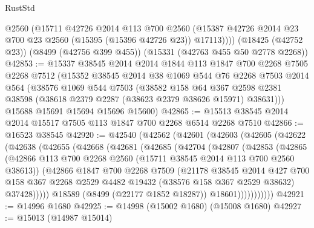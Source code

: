 \begin{lexlean}{RustStd}
\begin{coremodule}
        @2560
        (@15711
          @42726
          @2014
          @113
          @700
          @2560
          (@15387 @42726 @2014 @23 @700 @23 @2560 (@15395 (@15396 @42726 @23)) @17113))))
    (@18425 (@42752 @23))
    (@8499 (@42756 @399 @455))
    (@15331 (@42763 @455 @50 @2778 @2268))
@42853 := @15337
    @38545
    @2014
    @2014
    @1844
    @113
    @1847
    @700
    @2268
    @7505
    @2268
    @7512
    (@15352
      @38545
      @2014
      @38
      @1069
      @544
      @76
      @2268
      @7503
      @2014
      @564
      (@38576
        @1069
        @544
        @7503
        (@38582
          @158
          @64
          @367
          @2598
          @2381
          @38598
          (@38618 @2379 @2287 (@38623 @2379 @38626 @15971) @38631)))
      @15688
      @15691
      @15694
      @15696
      @15600)
@42865 := @15513 @38545 @2014 @2014 @15517 @7505 @113 @1847 @700 @2268 @6514 @2268 @7510
@42866 := @16523 @38545
@42920 := @42540
    (@42562
      (@42601
        (@42603
          (@42605
            (@42622
              (@42638
                (@42655
                  (@42668
                    (@42681
                      (@42685
                        (@42704
                          (@42807
                            (@42853
                              (@42865
                                (@42866
                                  @113
                                  @700
                                  @2268
                                  @2560
                                  (@15711 @38545 @2014 @113 @700 @2560 @38613))
                                (@42866
                                  @1847
                                  @700
                                  @2268
                                  @7509
                                  (@21178
                                    @38545
                                    @2014
                                    @427
                                    @700
                                    @158
                                    @367
                                    @2268
                                    @2529
                                    @4482
                                    @19432
                                    (@38576 @158 @367 @2529 @38632)
                                    @37428)))))
                          @18589
                          (@8499 (@22177 @1852 @18287))
                          @18601)))))))))))
@42921 := @14996 @1680
@42925 := @14998 (@15002 @1680) (@15008 @1680)
@42927 := @15013 (@14987 @15014)

\end{coremodule}
\end{lexlean}
